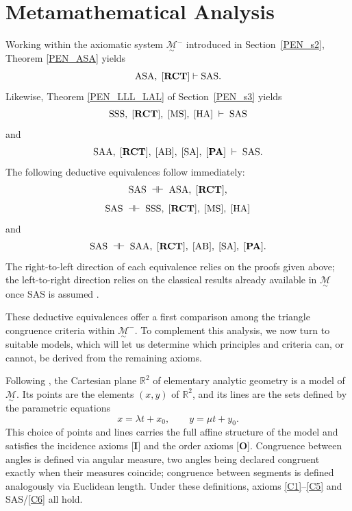 \documentclass[11pt,a4paper]{article}
\theoremstyle{definition}
\theoremstyle{remark}
\numberwithin{equation}{section}
\newcommand{\MG}{\underset{\sim}{\mathcal{M}}} %
\begin{document}
\section{Metamathematical Analysis}\label{PEN_s4}

Working within the axiomatic system $\MG^{-}$ introduced in Section~\ref{PEN_s2}, Theorem
\ref{PEN_ASA} yields
\begin{equation}\label{PEN_ALA}
\textrm{ASA},\; \textrm{[\textbf{RCT}]}
\vdash
\textrm{SAS}.
\end{equation}
Likewise, Theorem \ref{PEN_LLL_LAL} of Section~\ref{PEN_s3} yields
\begin{equation}\label{PEN_LLL}
\textrm{SSS},\;\textrm{[\textbf{RCT}]},\;\ref{MS},\;\ref{HA}\;\vdash\;\textrm{SAS}
\end{equation}
and
\begin{equation}\label{PEN_LAA}
\textrm{SAA},\;\textrm{[\textbf{RCT}]},\;\ref{AB},\;\ref{SA},\;[\mathbf{PA}]\;\vdash\;\textrm{SAS}.
\end{equation}
The following deductive equivalences follow immediately:
\begin{equation}\label{PEN_EALA}
\textrm{SAS}
\;\dashv\vdash\;
\textrm{ASA},\;\textrm{[\textbf{RCT}]},
\end{equation}
\begin{equation}\label{PEN_ESSS}
\textrm{SAS}
\;\dashv\vdash\;
\textrm{SSS},\;\textrm{[\textbf{RCT}]},\;\ref{MS},\;\ref{HA}
\end{equation}
and
\begin{equation}\label{PEN_ESAA}
\textrm{SAS}
\;\dashv\vdash\;
\textrm{SAA},\;\textrm{[\textbf{RCT}]},\;\ref{AB},\;\ref{SA},\;[\mathbf{PA}].
\end{equation}
The right-to-left direction of each equivalence relies on the proofs given above; the
left-to-right direction relies on the classical results already available in $\MG$ once SAS is
assumed \cite{Hilbert1950}.

These deductive equivalences offer a first comparison among the triangle congruence criteria
within $\MG^{-}$. To complement this analysis, we now turn to suitable models, which will let
us determine which principles and criteria can, or cannot, be derived from the remaining
axioms.

Following \cite{Hilbert1950}, the Cartesian plane $\mathbb{R}^{2}$ of elementary analytic
geometry is a model of $\MG$. Its points are the elements $(x,y)$ of $\mathbb{R}^{2}$, and its
lines are the sets defined by the parametric equations
\begin{equation}\label{PEN_s4_e1}
x=\lambda t+x_{0},\qquad y=\mu t+y_{0}.
\end{equation}
This choice of points and lines carries the full affine structure of the model and satisfies
the incidence axioms [\textbf{I}] and the order axioms [\textbf{O}]. Congruence between angles
is defined via angular measure, two angles being declared congruent exactly when their measures
coincide; congruence between segments is defined analogously via Euclidean length. Under these
definitions, axioms \ref{C1}--\ref{C5} and SAS/\ref{C6} all hold.
\end{document}

